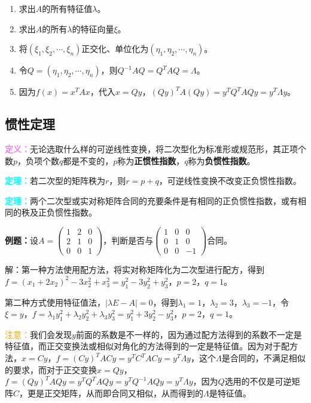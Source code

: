 \documentclass[UTF8, 12pt]{ctexart}
\begin{document}
\begin{enumerate}
    \item 求出$A$的所有特征值$\lambda$。
    \item 求出$A$的所有$\lambda$的特征向量$\xi$。
    \item 将$(\xi_1,\xi_2,\cdots,\xi_n)$正交化、单位化为$(\eta_1,\eta_2,\cdots,\eta_n)$。
    \item 令$Q=(\eta_1,\eta_2,\cdots,\eta_n)$，则$Q^{-1}AQ=Q^TAQ=\Lambda$。
    \item 因为$f(x)=x^TAx$，代入$x=Qy$，$(Qy)^TA(Qy)=y^TQ^TAQy=y^T\Lambda y$。
\end{enumerate}

\subsection{惯性定理}

\textcolor{violet}{\textbf{定义：}}无论选取什么样的可逆线性变换，将二次型化为标准形或规范形，其正项个数$p$，负项个数$q$都是不变的，$p$称为\textbf{正惯性指数}，$q$称为\textbf{负惯性指数}。

\textcolor{aqua}{\textbf{定理：}}若二次型的矩阵秩为$r$，则$r=p+q$，可逆线性变换不改变正负惯性指数。

\textcolor{aqua}{\textbf{定理：}}两个二次型或实对称矩阵合同的充要条件是有相同的正负惯性指数，或有相同的秩及正负惯性指数。

\textbf{例题：}设$A=\left(\begin{array}{ccc}
    1 & 2 & 0 \\
    2 & 1 & 0 \\
    0 & 0 & 1
\end{array}\right)$，判断是否与$\left(\begin{array}{ccc}
    1 & 0 & 0 \\
    0 & 1 & 0 \\
    0 & 0 & -1
\end{array}\right)$合同。

解：第一种方法使用配方法，将实对称矩阵化为二次型进行配方，得到$f=(x_1+2x_2)^2-3x_2^2+x_3^2=y_1^2-3y_2^2+y_3^2$，$p=2$，$q=1$。

第二种方式使用特征值法，$\vert\lambda E-A\vert=0$，得到$\lambda_1=1$，$\lambda_2=3$，$\lambda_3=-1$，令$\xi=y$，$f=\lambda_1y_1^2+\lambda_2y_2^2+\lambda_3y_3^2=y_1^2+3y_2^2-y_3^2$，$p=2$，$q=1$。

\textcolor{orange}{注意：}我们会发现$y$前面的系数是不一样的，因为通过配方法得到的系数不一定是特征值，而正交变换法或相似对角化的方法得到的一定是特征值。因为对于配方法，$x=Cy$，$f=(Cy)^TACy=y^TC^TACy=y^T\Lambda y$，这个$\Lambda$是合同的，不满足相似的要求，而对于正交变换$x=Qy$，$f=(Qy)^TAQy=y^TQ^TAQy=y^TQ^{-1}AQy=y^T\Lambda y$，因为$Q$选用的不仅是可逆矩阵$C$，更是正交矩阵，从而即合同又相似，从而得到的$\Lambda$是特征值。
\end{document}
